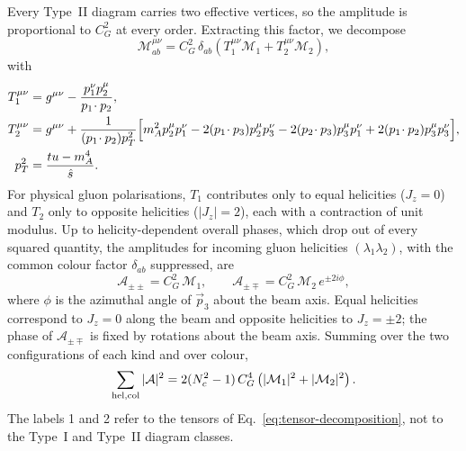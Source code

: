 Every Type~II diagram carries two effective vertices, so the amplitude is proportional to $C_G^2$ at every order.
Extracting this factor, we decompose
\begin{equation}
 \mathcal{M}^{\mu\nu}_{ab}
 =C_G^2\,\delta_{ab}\left(T_1^{\mu\nu}\mathcal{M}_1+T_2^{\mu\nu}\mathcal{M}_2\right),
 \label{eq:tensor-decomposition}
\end{equation}
with
\begin{align}
 T_1^{\mu\nu}
 &=g^{\mu\nu}-\frac{p_1^\nu p_2^\mu}{p_1\!\cdot p_2},
 \label{eq:tensor-one}\\
 T_2^{\mu\nu}
 &=g^{\mu\nu}+\frac{1}{(p_1\!\cdot p_2)p_T^2}
 \Bigl[
 m_A^2p_2^\mu p_1^\nu
 -2(p_1\!\cdot p_3)p_2^\mu p_3^\nu
 -2(p_2\!\cdot p_3)p_3^\mu p_1^\nu
 +2(p_1\!\cdot p_2)p_3^\mu p_3^\nu
 \Bigr],
 \label{eq:tensor-two}\\
 p_T^2&=\frac{tu-m_A^4}{\hat s}.
 \label{eq:pt-definition}
\end{align}
For physical gluon polarisations, $T_1$ contributes only to equal helicities ($J_z=0$) and $T_2$ only to opposite helicities ($|J_z|=2$), each with a contraction of unit modulus.
Up to helicity-dependent overall phases, which drop out of every squared
quantity, the amplitudes for incoming gluon helicities
$(\lambda_1\lambda_2)$, with the common colour factor $\delta_{ab}$ suppressed,
are~\cite{Glover:1987nx}
\begin{equation}
 \mathcal A_{\pm\pm}=C_G^2\,\mathcal M_1,
 \qquad
 \mathcal A_{\pm\mp}=C_G^2\,\mathcal M_2\,e^{\pm2i\phi},
 \label{eq:helicity}
\end{equation}
where $\phi$ is the azimuthal angle of $\vec p_3$ about the beam axis.
Equal helicities correspond to $J_z=0$ along the beam and opposite helicities to $J_z=\pm2$; the phase of $\mathcal A_{\pm\mp}$ is fixed by rotations about the beam axis. Summing over the two configurations of each kind and over colour,
\begin{equation}
 \sum_{\mathrm{hel,col}}|\mathcal A|^2
=2(N_c^2-1)\,C_G^4\left(|\mathcal M_1|^2+|\mathcal M_2|^2\right).
\end{equation}
The labels 1 and 2 refer to the tensors of
Eq.~\eqref{eq:tensor-decomposition}, not to the Type~I and Type~II diagram classes.

